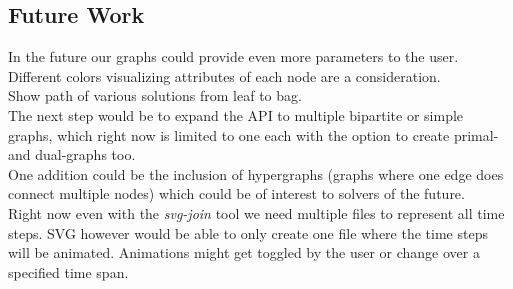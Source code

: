 \documentclass[a4paper, 12pt, bibliography=totoc]{scrartcl}
\begin{document}
\subsection{Future Work}
In the future our graphs could provide even more parameters to the user. \\

Different colors visualizing attributes of each node are a consideration.\\

Show path of various solutions from leaf to bag. \\


The next step would be to expand the API to multiple bipartite or simple graphs, which right now is limited to one each with the option to create primal- and dual-graphs too.\\

One addition could be the inclusion of hypergraphs (graphs where one edge does connect multiple nodes) which could be of interest to solvers of the future.\\

Right now even with the \textit{svg-join} tool we need multiple files to represent all time steps. SVG however would be able to only create one file where the time steps will be animated. Animations might get toggled by the user or change over a specified time span.
\newpage
\appendix
\end{document}
